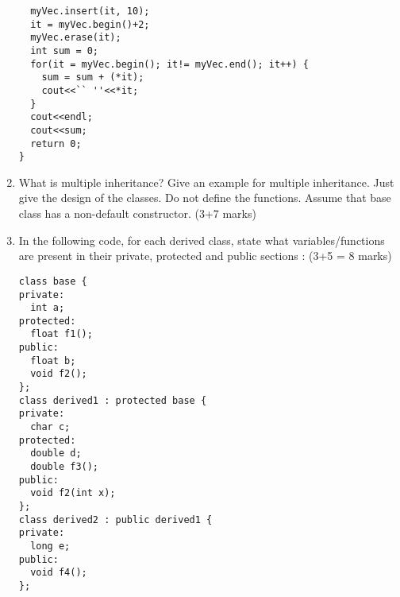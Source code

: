 \documentclass[12pt]{article}
\begin{document}
\begin{enumerate}
\begin{lstlisting}
  myVec.insert(it, 10);
  it = myVec.begin()+2;
  myVec.erase(it);
  int sum = 0;
  for(it = myVec.begin(); it!= myVec.end(); it++) {
    sum = sum + (*it);
    cout<<`` ''<<*it;
  }
  cout<<endl;
  cout<<sum;
  return 0;
}
  \end{lstlisting}\newpage
\item What is multiple inheritance? Give an example for multiple inheritance. Just give the design of the classes. Do not define the functions. Assume that base class has a non-default constructor. (3+7 marks)\vspace*{75mm}
\item In the following code, for each derived class, state what variables/functions are present in their private, protected and public sections : (3+5 = 8 marks)
  \begin{lstlisting}
class base {
private:
  int a;
protected:
  float f1();
public:
  float b;
  void f2();
};
class derived1 : protected base {
private:
  char c;
protected:
  double d;
  double f3();
public:
  void f2(int x);
};
class derived2 : public derived1 {
private:
  long e;
public:
  void f4();
};
  \end{lstlisting}

\end{enumerate}
\end{document}
